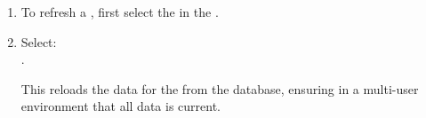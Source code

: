 

\begin{enumerate}
\item To refresh a \gdproject{}, first select the \gdproject{} in the \gdtestsuitebrowser{}.
\item Select:\\
.

This reloads the data for the \gdproject{} from the database, ensuring in a multi-user environment that all \gdproject data is current.


\end{enumerate}
